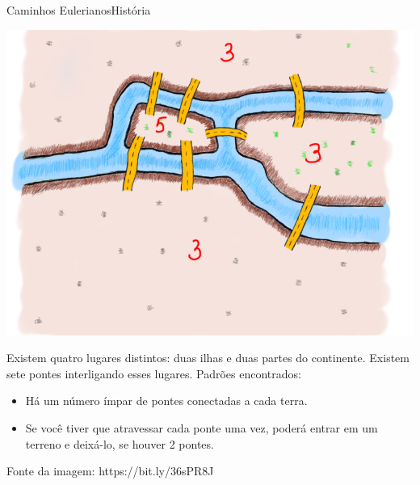 \documentclass[t]{beamer}
\begin{document}
\begin{ftst}{Caminhos Eulerianos}{História}
\vone
\vone
\begin{minipage}{.5\textwidth}
    \centering
    \includegraphics[scale=0.21]{Figuras/euleriano_2.png}
\end{minipage}%
\hfill
\begin{minipage}{.5\textwidth}
    \justifying
    \footnotesize
    Existem quatro lugares distintos: duas ilhas e duas partes do continente. 
    \vone
    Existem sete pontes interligando esses lugares. 
    \vone
    Padrões encontrados:
    \begin{itemize}
        \item Há um número ímpar de pontes conectadas a cada terra.
        \item Se você tiver que atravessar cada ponte uma vez, poderá entrar em um terreno e deixá-lo, se houver 2 pontes.
    \end{itemize}
\end{minipage}

\vone
\vone
\tiny
Fonte da imagem: \hypertarget{clique aqui.}{https://bit.ly/36sPR8J}
\end{ftst}

\end{document}
